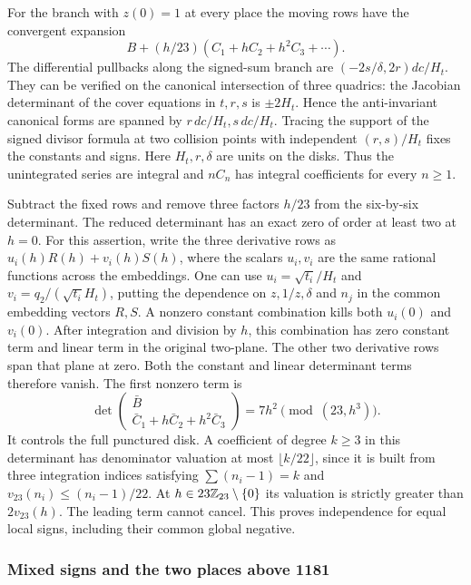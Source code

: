 For the branch with $z(0)=1$ at every place the moving rows have the
convergent expansion
\[
 B+(h/23)(C_1+hC_2+h^2C_3+\cdots).
\]
The differential pullbacks along the signed-sum branch are
$(-2s/\delta,2r)dc/H_t$. They can be verified on the canonical
intersection of three quadrics: the Jacobian determinant of the
cover equations in $t,r,s$ is $\pm2H_t$. Hence the anti-invariant
canonical forms are spanned by $r\,dc/H_t,s\,dc/H_t$.
Tracing the support of the signed divisor formula at two collision
points with independent $(r,s)/H_t$ fixes the constants and signs.
Here $H_t,r,\delta$ are units on the disks. Thus the unintegrated
series are integral and $nC_n$ has integral coefficients for every
$n\geq1$.

Subtract the fixed rows and remove three factors $h/23$ from the
six-by-six determinant. The reduced determinant has an exact zero
of order at least two at $h=0$. For this assertion, write the three
derivative rows as $u_i(h)R(h)+v_i(h)S(h)$, where the scalars
$u_i,v_i$ are the same rational functions across the embeddings.
One can use $u_i=\sqrt{t_i}/H_t$ and
$v_i=q_2/(\sqrt{t_i}H_t)$, putting the dependence on $z,1/z,\delta$
and $n_j$ in the common embedding vectors $R,S$. A nonzero constant
combination kills both $u_i(0)$ and $v_i(0)$. After integration and
division by $h$, this combination has zero constant term and linear
term in the original two-plane. The other two derivative rows span
that plane at zero. Both the constant and linear determinant terms
therefore vanish. The first nonzero term is
\[
 \det\begin{pmatrix}\bar B\\
       \bar C_1+h\bar C_2+h^2\bar C_3\end{pmatrix}
        =7h^2\pmod{(23,h^3)}.
\]
It controls the full punctured disk. A coefficient of degree $k\geq3$
in this determinant has denominator valuation at most
$\lfloor k/22\rfloor$, since it is built from three integration
indices satisfying $\sum(n_i-1)=k$ and
$v_{23}(n_i)\leq(n_i-1)/22$. At $h\in23\mathbb Z_{23}\setminus\{0\}$
its valuation is strictly greater than $2v_{23}(h)$. The leading
term cannot cancel. This proves independence for equal local signs,
including their common global negative.

\subsubsection{Mixed signs and the two places above 1181}

